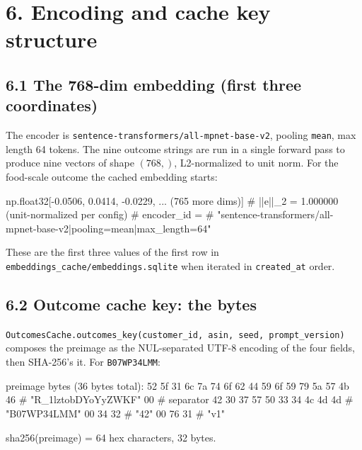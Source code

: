 \documentclass[11pt,a4paper]{article}
\begin{document}
\section*{6. Encoding and cache key structure}

\subsection*{6.1 The 768-dim embedding (first three coordinates)}

The encoder is \texttt{sentence-transformers/all-mpnet-base-v2},
pooling \texttt{mean}, max length 64 tokens. The nine outcome strings
are run in a single forward pass to produce nine vectors of shape
$(768,)$, L2-normalized to unit norm. For the food-scale outcome the
cached embedding starts:

\begin{code}
np.float32[-0.0506, 0.0414, -0.0229, ...  (765 more dims)]
# ||e||_2 = 1.000000  (unit-normalized per config)
# encoder_id =
#   "sentence-transformers/all-mpnet-base-v2|pooling=mean|max_length=64"
\end{code}

These are the first three values of the first row in
\texttt{embeddings\_cache/embeddings.sqlite} when iterated in
\texttt{created\_at} order.

\subsection*{6.2 Outcome cache key: the bytes}

\texttt{OutcomesCache.outcomes\_key(customer\_id, asin, seed,
prompt\_version)} composes the preimage as the NUL-separated UTF-8
encoding of the four fields, then SHA-256's it. For
\texttt{B07WP34LMM}:

\begin{code}
preimage bytes (36 bytes total):
  52 5f 31 6c 7a 74 6f 62 44 59 6f 59 79 5a 57 4b 46   # "R_1lztobDYoYyZWKF"
  00                                                    # separator
  42 30 37 57 50 33 34 4c 4d 4d                         # "B07WP34LMM"
  00
  34 32                                                 # "42"
  00
  76 31                                                 # "v1"

sha256(preimage) = 64 hex characters, 32 bytes.
\end{code}
\end{document}
